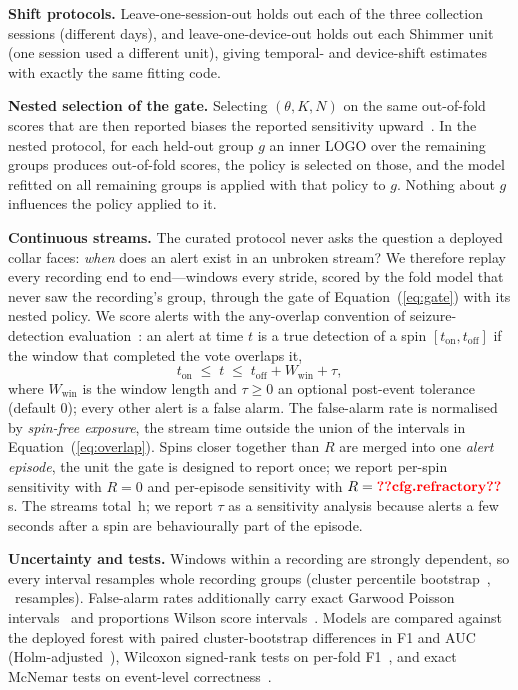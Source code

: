 \textbf{Shift protocols.} Leave-one-session-out holds out each of the three collection sessions (different days), and leave-one-device-out holds out each Shimmer unit (one session used a different unit), giving temporal- and device-shift estimates with exactly the same fitting code.

\textbf{Nested selection of the gate.} Selecting $(\theta,K,N)$ on the same out-of-fold scores that are then reported biases the reported sensitivity upward~\cite{varma2006bias,cawley2010overfitting}. In the nested protocol, for each held-out group $g$ an inner LOGO over the remaining groups produces out-of-fold scores, the policy is selected on those, and the model refitted on all remaining groups is applied with that policy to $g$. Nothing about $g$ influences the policy applied to it.

\textbf{Continuous streams.} The curated protocol never asks the question a deployed collar faces: \emph{when} does an alert exist in an unbroken stream? We therefore replay every recording end to end---windows every stride, scored by the fold model that never saw the recording's group, through the gate of Equation~(\ref{eq:gate}) with its nested policy. We score alerts with the any-overlap convention of seizure-detection evaluation~\cite{shah2021metrics,dan2025szcore}: an alert at time $t$ is a true detection of a spin $[t_{\text{on}}, t_{\text{off}}]$ if the window that completed the vote overlaps it,
\begin{equation}
t_{\text{on}} \;\leq\; t \;\leq\; t_{\text{off}} + W_{\text{win}} + \tau,
\label{eq:overlap}
\end{equation}
where $W_{\text{win}}$ is the window length and $\tau\geq 0$ an optional post-event tolerance (default 0); every other alert is a false alarm. The false-alarm rate is normalised by \emph{spin-free exposure}, the stream time outside the union of the intervals in Equation~(\ref{eq:overlap}). Spins closer together than $R$ are merged into one \emph{alert episode}, the unit the gate is designed to report once; we report per-spin sensitivity with $R=0$ and per-episode sensitivity with $R=\R{cfg.refractory}$\,s. The streams total \,h; we report $\tau$ as a sensitivity analysis because alerts a few seconds after a spin are behaviourally part of the episode.

\textbf{Uncertainty and tests.} Windows within a recording are strongly dependent, so every interval resamples whole recording groups (cluster percentile bootstrap~\cite{field2007clustered,efron1993bootstrap}, ~resamples). False-alarm rates additionally carry exact Garwood Poisson intervals~\cite{garwood1936} and proportions Wilson score intervals~\cite{wilson1927}. Models are compared against the deployed forest with paired cluster-bootstrap differences in F1 and AUC (Holm-adjusted~\cite{holm1979}), Wilcoxon signed-rank tests on per-fold F1~\cite{wilcoxon1945}, and exact McNemar tests on event-level correctness~\cite{dietterich1998tests}.

